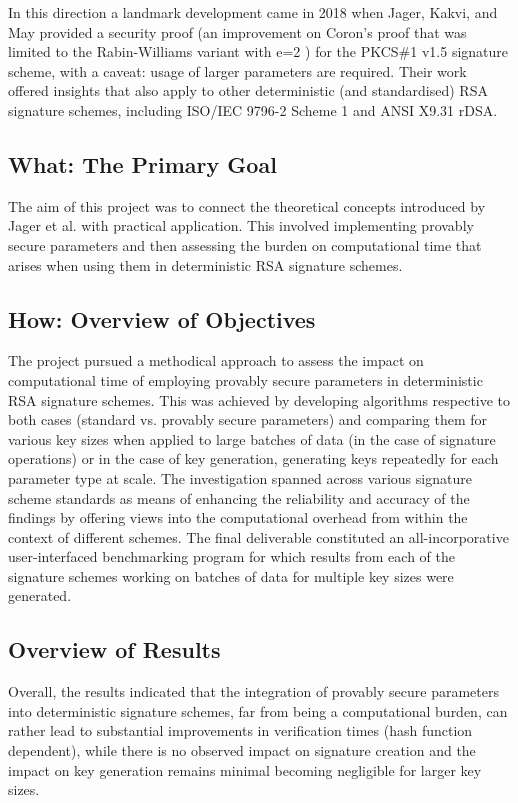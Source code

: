 \documentclass[]{final_report}
\theoremstyle{definition}
\begin{document}
In this direction a landmark development came in 2018 when Jager, Kakvi, and May \cite{jager2018security} provided a security proof (an improvement on Coron's proof that was limited to the Rabin-Williams variant with e=2 \cite{coron2002security}) for the PKCS\#1 v1.5 signature scheme, with a caveat: usage of larger parameters are required. Their work offered insights that also apply to other deterministic (and standardised) RSA signature schemes, including ISO/IEC 9796-2 Scheme 1 and ANSI X9.31 rDSA.

\subsection{What: The Primary Goal}
The aim of this project was to connect the theoretical concepts introduced by Jager et al. \cite{jager2018security} with practical application. This involved implementing provably secure parameters and then assessing the burden on computational time that arises when using them in deterministic RSA signature schemes.

\subsection{How: Overview of Objectives}
The project pursued a methodical approach to assess the impact on computational time of employing provably secure parameters in deterministic RSA signature schemes. This was achieved by developing algorithms respective to both cases (standard vs. provably secure parameters) and comparing them for various key sizes when applied to large batches of data (in the case of signature operations) or in the case of key generation, generating keys repeatedly for each parameter type at scale.
The investigation spanned across various signature scheme standards as means of enhancing the reliability and accuracy of the findings by offering views into the computational overhead from within the context of different schemes. The final deliverable constituted an all-incorporative user-interfaced benchmarking program for which results from each of the signature schemes working on batches of data for multiple key sizes were generated.

\subsection{Overview of Results}
Overall, the results indicated that the integration of provably secure parameters into deterministic signature schemes, far from being a computational burden, can rather lead to substantial improvements in verification times (hash function dependent), while there is no observed impact on signature creation and the impact on key generation remains minimal becoming negligible for larger key sizes.
\end{document}
